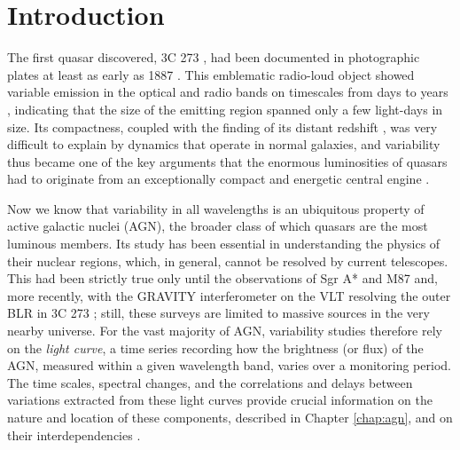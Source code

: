 \chapter{Introduction}
\label{chap:introduction}

The first quasar discovered, 3C 273 \parencite{Edge19593C273Catalogue}, had been documented in photographic plates at least as early as 1887 \parencite{Slavchevamihova20133c273half}. This emblematic radio-loud object showed variable emission in the optical and radio bands on timescales from days to years \parencites{SmithH19633C273Var2}{Dent19653C273Var}, indicating that the size of the emitting region spanned only a few light-days in size. Its compactness, coupled with the finding of its distant redshift \parencite{Schmidt19633C273z}, was very difficult to explain by dynamics that operate in normal galaxies, and variability thus became one of the key arguments that the enormous luminosities of quasars had to originate from an exceptionally compact and energetic central engine \parencites{Salpeter1964AccretionTheory}{Zeldovich1964AccretionTheory}.

Now we know that variability in all wavelengths is an ubiquitous property of active galactic nuclei (AGN), the broader class of which quasars are the most luminous members. Its study has been essential in understanding the physics of their nuclear regions, which, in general, cannot be resolved by current telescopes. This had been strictly true only until the observations of Sgr A* and M87 \parencite{EventHorizonTelescope2019} and, more recently, with the GRAVITY interferometer on the VLT resolving the outer BLR in 3C 273 \parencite{Gravity20183C273BLR}; still, these surveys are limited to massive sources in the very nearby universe. 
For the vast majority of AGN, variability studies therefore rely on the \textit{light curve}, a time series recording how the brightness (or flux) of the AGN, measured within a given wavelength band, varies over a monitoring period. The time scales, spectral changes, and the correlations and delays between variations extracted from these light curves provide crucial information on the nature and location of these components, described in Chapter \ref{chap:agn}, and on their interdependencies \parencite{Ulrich1997VARIABILITY}. 

